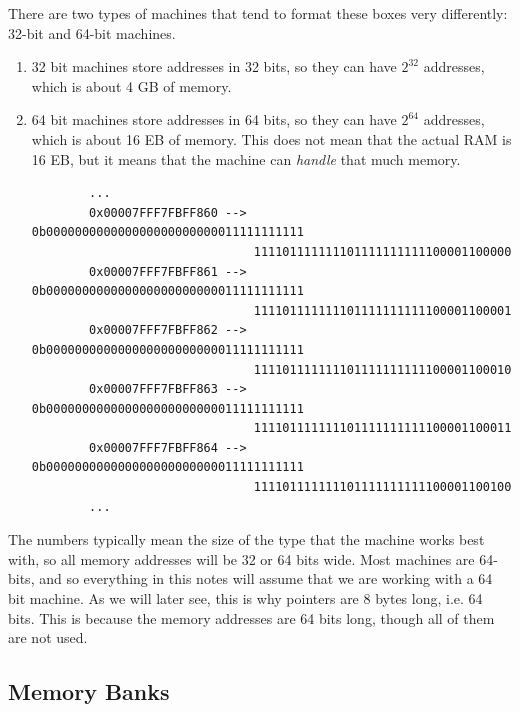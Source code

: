   \begin{definition}
    There are two types of machines that tend to format these boxes very differently: 32-bit and 64-bit machines. 
    \begin{enumerate}
      \item 32 bit machines store addresses in 32 bits, so they can have $2^{32}$ addresses, which is about 4 GB of memory. 
      \item 64 bit machines store addresses in 64 bits, so they can have $2^{64}$ addresses, which is about 16 EB of memory. This does not mean that the actual RAM is 16 EB, but it means that the machine can \textit{handle} that much memory. 
      \begin{lstlisting} 
        ...
        0x00007FFF7FBFF860 --> 0b000000000000000000000000011111111111
                               111101111111101111111111100001100000
        0x00007FFF7FBFF861 --> 0b000000000000000000000000011111111111
                               111101111111101111111111100001100001
        0x00007FFF7FBFF862 --> 0b000000000000000000000000011111111111
                               111101111111101111111111100001100010
        0x00007FFF7FBFF863 --> 0b000000000000000000000000011111111111
                               111101111111101111111111100001100011
        0x00007FFF7FBFF864 --> 0b000000000000000000000000011111111111
                               111101111111101111111111100001100100
        ...
      \end{lstlisting}
    \end{enumerate}
    The numbers typically mean the size of the type that the machine works best with, so all memory addresses will be 32 or 64 bits wide. Most machines are 64-bits, and so everything in this notes will assume that we are working with a 64 bit machine. As we will later see, this is why pointers are 8 bytes long, i.e. 64 bits. This is because the memory addresses are 64 bits long, though all of them are not used. 
  \end{definition}

\subsection{Memory Banks}


